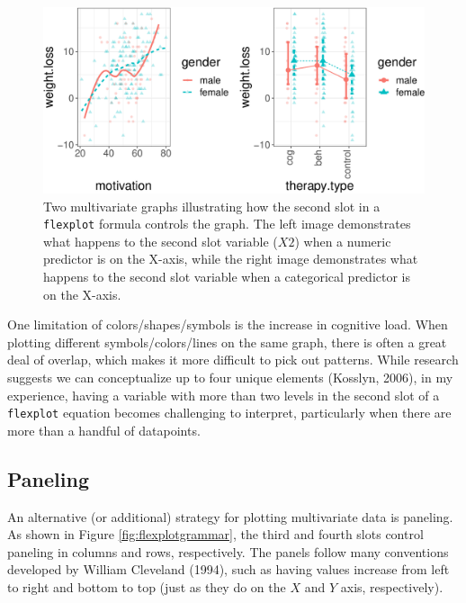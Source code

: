 \documentclass[
  man]{apa6}
\begin{document}
\begin{figure}
\centering
\includegraphics{flexplot_psychmeth_files/figure-latex/symbols-1.pdf}
\caption{\label{fig:symbols}Two multivariate graphs illustrating how the second slot in a \texttt{flexplot} formula controls the graph. The left image demonstrates what happens to the second slot variable (\(X2\)) when a numeric predictor is on the X-axis, while the right image demonstrates what happens to the second slot variable when a categorical predictor is on the X-axis.}
\end{figure}

\normalsize

One limitation of colors/shapes/symbols is the increase in cognitive load. When plotting different symbols/colors/lines on the same graph, there is often a great deal of overlap, which makes it more difficult to pick out patterns. While research suggests we can conceptualize up to four unique elements (Kosslyn, 2006), in my experience, having a variable with more than two levels in the second slot of a \texttt{flexplot} equation becomes challenging to interpret, particularly when there are more than a handful of datapoints.

\hypertarget{paneling}{%
\subsection{Paneling}\label{paneling}}

An alternative (or additional) strategy for plotting multivariate data is paneling. As shown in Figure \ref{fig:flexplotgrammar}, the third and fourth slots control paneling in columns and rows, respectively. The panels follow many conventions developed by William Cleveland (1994), such as having values increase from left to right and bottom to top (just as they do on the \(X\) and \(Y\) axis, respectively).
\end{document}
